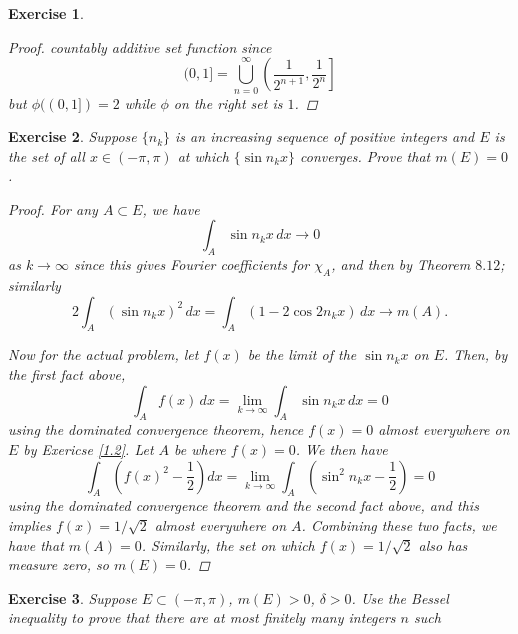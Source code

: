 \documentclass[10pt,letterpaper]{amsart}
\newtheorem{exercise}{Exercise}[section]
\theoremstyle{definition}
\theoremstyle{remark}
\numberwithin{equation}{exercise}
\begin{document}
\begin{multicols}{2}
\begin{exercise}
\begin{proof}
      countably additive set function since
      \begin{equation*}
        (0,1] = \bigcup_{n=0}^\infty \left(
        \frac{1}{2^{n+1}},\frac{1}{2^{n}}\right]
      \end{equation*}
      but $\phi((0,1]) = 2$ while $\phi$ on the right set is $1$.
    \end{proof}
  \end{exercise}
  \begin{exercise}
    Suppose $\{n_k\}$ is an increasing sequence of positive integers and $E$ is
    the set of all $x \in (-\pi,\pi)$ at which $\{\sin n_k x\}$ converges. Prove
    that $m(E) = 0$.
    \begin{proof}
      For any $A \subset E$, we have
      \begin{equation*}
        \int_A \sin n_kx\,dx \to 0
      \end{equation*}
      as $k \to \infty$
      since this gives Fourier coefficients for $\chi_A$, and then by Theorem
      $8.12$; similarly
      \begin{equation*}
        2\int_A (\sin n_kx)^2\,dx = \int_A (1-2\cos 2n_kx) \,dx \to m(A).
      \end{equation*}
      \par Now for the actual problem, let $f(x)$ be the limit of the $\sin
      n_kx$ on $E$. Then, by the first fact above,
      \begin{equation*}
        \int_A f(x)\,dx = \lim_{k \to \infty} \int_A \sin n_kx\,dx = 0
      \end{equation*}
      using the dominated convergence theorem, hence $f(x) = 0$ almost
      everywhere on $E$ by Exericse \ref{1.2}. Let $A$ be where $f(x) = 0$.
      We then have
      \begin{equation*}
        \int_A \left(f(x)^2 - \frac{1}{2}\right)dx
        = \lim_{k \to \infty} \int_A \left(\sin^2 n_kx - \frac{1}{2}\right) = 0
      \end{equation*}
      using the dominated convergence theorem and the second fact above, and 
      this implies $f(x) = 1/\sqrt{2}$ almost everywhere on $A$. Combining these
      two facts, we have that $m(A) = 0$. Similarly, the set on which $f(x) =
      1/\sqrt{2}$ also has measure zero, so $m(E) = 0$.
    \end{proof}
  \end{exercise}
  \begin{exercise}
    Suppose $E \subset (-\pi,\pi)$, $m(E) > 0$, $\delta > 0$. Use the Bessel
    inequality to prove that there are at most finitely many integers $n$ such

\end{exercise}
\end{multicols}
\end{document}

